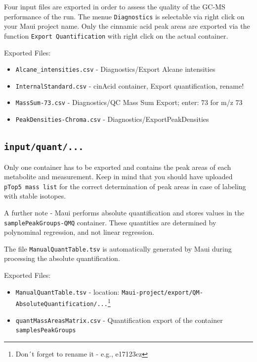 \documentclass[]{book}
\providecommand{\tightlist}{%
  \setlength{\itemsep}{0pt}\setlength{\parskip}{0pt}}
\let\rmarkdownfootnote\footnote%
\def\footnote{\protect\rmarkdownfootnote}
\begin{document}
Four input files are exported in order to assess the quality of the
GC-MS performance of the run. The menue \texttt{Diagnostics} is
selectable via right click on your Maui project name. Only the cinnamic
acid peak areas are exported via the function
\texttt{Export\ Quantification} with right click on the actual
container.

Exported Files:

\begin{itemize}
\tightlist
\item
  \texttt{Alcane\_intensities.csv} - Diagnostics/Export Alcane
  intensities
\item
  \texttt{InternalStandard.csv} - cinAcid container, Export
  quantification, rename!
\item
  \texttt{MassSum-73.csv} - Diagnostics/QC Mass Sum Export; enter: 73
  for m/z 73
\item
  \texttt{PeakDensities-Chroma.csv} - Diagnostics/ExportPeakDensities
\end{itemize}

\subsection{\texorpdfstring{\texttt{input/quant/...}}{input/quant/...}}\label{inputquant...}

Only one container has to be exported and contains the peak areas of
each metabolite and measurement. Keep in mind that you should have
uploaded \texttt{pTop5\ mass\ list} for the correct determination of
peak areas in case of labeling with stable isotopes.

A further note - Maui performs absolute quantification and stores values
in the \texttt{samplePeakGroups-QMQ} container. These quantities are
determined by polynominal regression, and not linear regression.

The file \texttt{ManualQuantTable.tsv} is automatically generated by
Maui during processing the absolute quantification.

Exported Files:

\begin{itemize}
\tightlist
\item
  \texttt{ManualQuantTable.tsv} - location:
  \texttt{Maui-project/export/QM-AbsoluteQuantification/...}\footnote{Don´t
    forget to rename it - e.g., e17123cz}
\item
  \texttt{quantMassAreasMatrix.csv} - Quantification export of the
  container \texttt{samplesPeakGroups}
\end{itemize}
\end{document}
